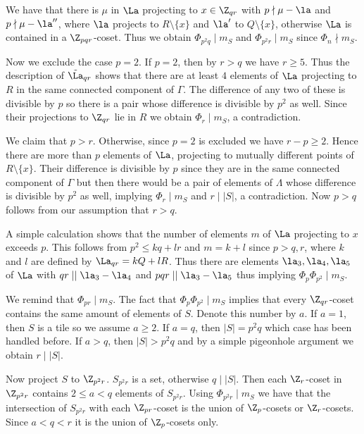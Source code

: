         We have that there is $\mu$ in $\La$ projecting to $x \in \Z_{qr}$ with $p \nmid \mu-\la$ and $p \nmid \mu-\la''$, where $\la$ projects to $R \setminus\{x\}$ and $\la'$ to $Q \setminus\{x\}$, otherwise $\La$ is contained in a $\Z_{pqr}$-coset. 
        Thus we obtain $\Phi_{p^2q} \mid m_S$ and $\Phi_{p^2r} \mid m_S$ since $\Phi_n \nmid m_S$.
        
        Now we exclude the case $p=2$. If $p=2$, then by $r>q$ we have $r \ge 5$. Thus the description of $\tilde{\La}_{qr}$ shows that there are at least $4$ elements of $\La$ projecting to $R$ in the same connected component of $\Gamma$. The difference of any two of these is divisible by $p$ so there is a pair whose difference is divisible by $p^2$ as well. Since their projections to $\Z_{qr}$ lie in $R$ we obtain $\Phi_r \mid m_S$, a contradiction. 
        
        We claim that $p>r$. Otherwise, since $p=2$ is excluded we have $r-p \ge 2$. Hence there are more than $p$ elements of $\La$, projecting to mutually different points of $R \setminus \{x\}$. Their difference is divisible by $p$ since they are in the same connected component of $\Gamma$ but then there would be a pair of elements of $\Lambda$ whose difference is divisible by $p^2$ as well, implying $\Phi_r \mid m_S$ and $r \mid |S| $, a contradiction. 
        Now $p>q$ follows from our assumption that $r > q$.
        
        
        A simple calculation shows that the number of elements $m$ of $\La$ projecting to $x$ exceeds $p$. This follows from $p^2 \le kq+lr$ and $m=k+l$ since $p>q,r$, where $k$ and $l$ are defined by $\La_{qr}=kQ+lR$. Thus there are elements $\la_3,\la_4,\la_5$ of $\La$ with $qr \mid \mid \la_3-\la_4$ and $pqr \mid \mid \la_3-\la_5$ thus implying $\Phi_p \Phi_{p^2} \mid m_S$.
        
        
        We remind that $\Phi_{pr} \mid m_S$.
        The fact that $\Phi_p \Phi_{p^2} \mid m_S$ implies that every $\Z_{qr}$-coset contains the same amount of elements of $S$. Denote this number by $a$. If $a=1$, then $S$ is a tile so we assume $a \ge 2$. 
        If $a=q$, then $|S|=p^2q$ which case has been handled before. If $a>q$, then $|S|>p^2q$ and by a simple pigeonhole argument  we obtain $r \mid |S|$.
        
        Now project $S$ to $\Z_{p^2r}$. $S_{p^2r}$ is a set, otherwise $q \mid |S|$.
        Then each $\Z_r$-coset in $\Z_{p^2r}$ contains $2 \le a < q$  elements of $S_{p^2r}$. 
        Using $\Phi_{p^2r} \mid m_S$ 
        we have that the intersection of $S_{p^2r}$ with each $\Z_{pr}$-coset is the union of $\Z_p$-cosets or $\Z_r$-cosets. Since $a<q<r$ 
        it is the union of $\Z_p$-cosets only. 
        

